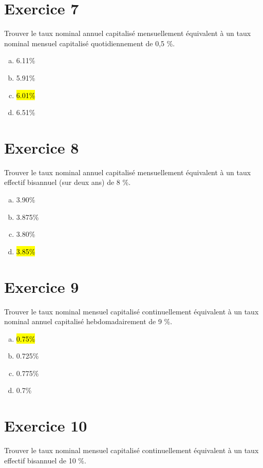 \documentclass[10pt,a4paper]{article}
\begin{document}
\section*{Exercice 7}
Trouver le taux nominal annuel capitalisé mensuellement équivalent à un taux nominal mensuel capitalisé quotidiennement de 0,5 \%.



\begin{enumerate}[a)]
\item 6.11\%
\item 5.91\%
\item \hl{6.01\%}
\item 6.51\%
\end{enumerate}


\section*{Exercice 8}
Trouver le taux nominal annuel capitalisé mensuellement équivalent à un taux effectif bisannuel (sur deux ans) de 8 \%.
 


\begin{enumerate}[a)]
\item 3.90\%
\item 3.875\%
\item 3.80\%
\item \hl{3.85\%}
\end{enumerate}


\section*{Exercice 9}
Trouver le taux nominal mensuel capitalisé continuellement équivalent à un taux nominal annuel capitalisé hebdomadairement de 9 \%.




\begin{enumerate}[a)]
\item \hl{0.75\%}
\item 0.725\%
\item 0.775\%
\item 0.7\%
\end{enumerate}


\section*{Exercice 10}
Trouver le taux nominal mensuel capitalisé continuellement équivalent à un taux effectif bisannuel de 10 \%.
\end{document}
